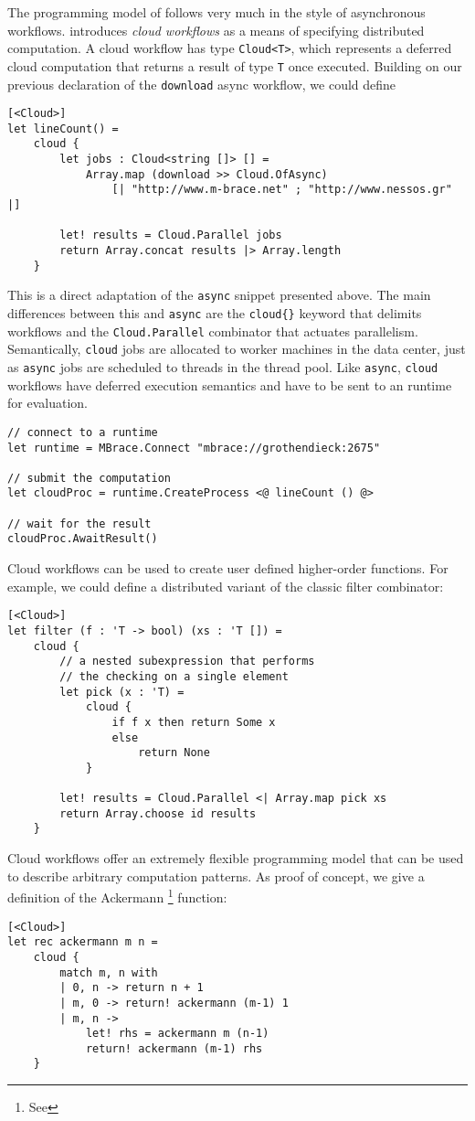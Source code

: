The programming model of \mbrace{} follows very much in the style of \fsharp{} 
asynchronous workflows. \Mbrace{} introduces \emph{cloud workflows}
as a means of specifying distributed computation.
A cloud workflow has type \texttt{Cloud<\uq{}T>}, which represents a
deferred cloud computation that returns a result of type \texttt{\uq{}T} once executed.
Building on our previous declaration of the \texttt{download} async workflow, we could define
\begin{lstlisting}
[<Cloud>]
let lineCount() = 
	cloud {
    	let jobs : Cloud<string []> [] = 
        	Array.map (download >> Cloud.OfAsync) 
				[| "http://www.m-brace.net" ; "http://www.nessos.gr" |]

	    let! results = Cloud.Parallel jobs
    	return Array.concat results |> Array.length
	}
\end{lstlisting}
This is a direct adaptation of the \texttt{async} snippet presented above.
The main differences between this and \texttt{async} 
are the \texttt{cloud\{\}} keyword that delimits workflows
and the \texttt{Cloud.Parallel} combinator that actuates parallelism.
Semantically, \texttt{cloud} jobs are allocated to worker machines in the data center, 
just as \texttt{async} jobs are scheduled to threads in the thread pool. 
Like \texttt{async}, \texttt{cloud} workflows have deferred execution semantics 
and have to be sent to an \mbrace{} runtime for evaluation.
\begin{lstlisting}
// connect to a runtime
let runtime = MBrace.Connect "mbrace://grothendieck:2675"

// submit the computation
let cloudProc = runtime.CreateProcess <@ lineCount () @>

// wait for the result
cloudProc.AwaitResult()
\end{lstlisting}
%
%
Cloud workflows can be used to create user defined higher-order functions. 
For example, we could define a distributed variant of the classic filter combinator:
\begin{lstlisting}
[<Cloud>]
let filter (f : 'T -> bool) (xs : 'T []) =
    cloud {
		// a nested subexpression that performs
		// the checking on a single element
		let pick (x : 'T) =
			cloud {
				if f x then return Some x
				else
					return None
			}

        let! results = Cloud.Parallel <| Array.map pick xs
		return Array.choose id results
    }
\end{lstlisting}
%
%
Cloud workflows offer an extremely flexible programming model that can
be used to describe arbitrary computation patterns.
As proof of concept, we give a definition of the Ackermann%
\footnote{See } function:
\begin{lstlisting}
[<Cloud>]
let rec ackermann m n =
    cloud {
        match m, n with
        | 0, n -> return n + 1
        | m, 0 -> return! ackermann (m-1) 1
        | m, n ->
            let! rhs = ackermann m (n-1)
            return! ackermann (m-1) rhs
    }
\end{lstlisting}
%
